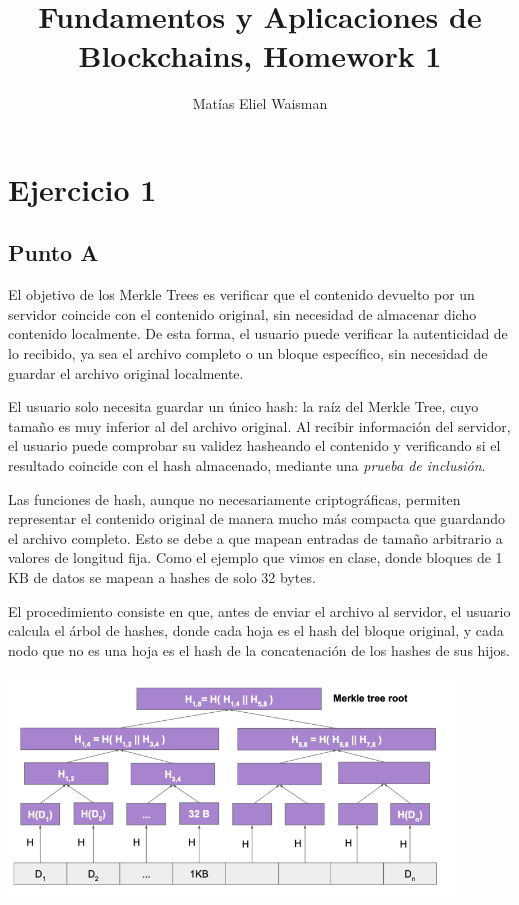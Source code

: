 \documentclass[12pt]{article}
\title{\fontsize{16}{18}\selectfont Fundamentos y Aplicaciones de Blockchains, Homework 1}
\author{Matías Eliel Waisman}
\date{}
\begin{document}
\maketitle

\section*{Ejercicio 1}

\subsection*{Punto A}

El objetivo de los Merkle Trees es verificar que el contenido devuelto por un servidor coincide con el contenido original, sin necesidad de almacenar dicho contenido localmente. De esta forma, el usuario puede verificar la autenticidad de lo recibido, ya sea el archivo completo o un bloque específico, sin necesidad de guardar el archivo original localmente.

El usuario solo necesita guardar un único hash: la raíz del Merkle Tree, cuyo tamaño es muy inferior al del archivo original. Al recibir información del servidor, el usuario puede comprobar su validez hasheando el contenido y verificando si el resultado coincide con el hash almacenado, mediante una \emph{prueba de inclusión}.

Las funciones de hash, aunque no necesariamente criptográficas, permiten representar el contenido original de manera mucho más compacta que guardando el archivo completo. Esto se debe a que mapean entradas de tamaño arbitrario a valores de longitud fija. Como el ejemplo que vimos en clase, donde bloques de 1 KB de datos se mapean a hashes de solo 32 bytes.

El procedimiento consiste en que, antes de enviar el archivo al servidor, el usuario calcula el árbol de hashes, donde cada hoja es el hash del bloque original, y cada nodo que no es una hoja es el hash de la concatenación de los hashes de sus hijos.

\begin{center}
\includegraphics[width=0.9\textwidth]{image.png}
\end{center}
\end{document}
